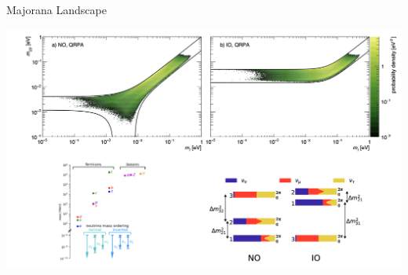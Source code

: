 \documentclass [aspectratio=169]{beamer}
\begin{document}
\begin{frame}{Majorana Landscape}

\includegraphics[scale=0.25]{landscape2.png}



%

\end{frame}
\end{document}
